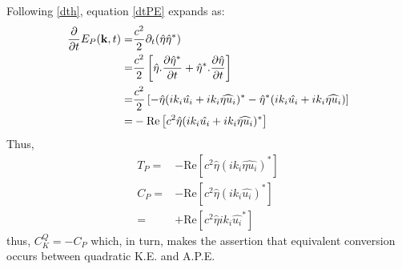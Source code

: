 Following \eqref{dth}, equation \eqref{dtPE} expands as:
\begin{align*}
 \pder{t}E_P(\mathbf{k},t)
 =& \frac{c^2}{2}\partial_t({\hat \eta}{\hat \eta^*})\\
 =& \frac{c^2}{2}\left[ \hat{\eta} .\pder[\hat{\eta}^*]{t}+ \hat 
\eta^*.\pder[\hat \eta]{t}\right]\\
 =& \frac{c^2}{2}\left[ - \hat{\eta} (ik_i\hat{ u_i } + ik_i\widehat{ 
      \eta u_i })^*  
	    - \hat{\eta}^* (ik_i\hat{ u_i } + ik_i\widehat{ 
      \eta u_i })  \right]\\
      =& -\text{Re}\left[c^2\hat{\eta} (ik_i\hat{ u_i } + ik_i\widehat{ 
      \eta u_i })^* \right]
\end{align*}
Thus,
\begin{align}
T_P= & -\text{Re}\left[c^2\hat{\eta} (ik_i\widehat{ 
      \eta u_i })^*  \right]\\
C_P=&  -\text{Re}\left[c^2\hat{\eta} (ik_i\hat{u_i })^*\right]\\
   =&  +\text{Re}\left[c^2\hat{\eta} ik_i\hat{u_i }^*\right]
\end{align}
thus, $C^Q_K = -C_P$ which, in turn, makes the assertion that  
equivalent conversion occurs between quadratic K.E. and A.P.E.
% 
% 
% 

% 
